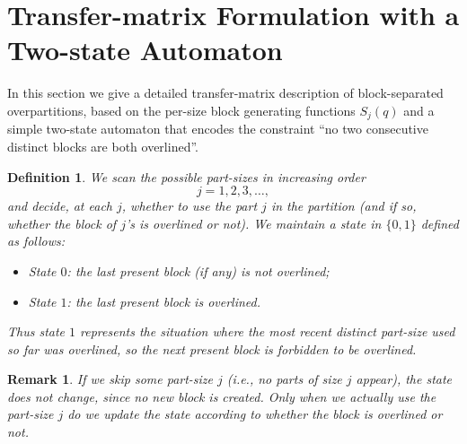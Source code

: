 \documentclass[letterpaper,12pt]{article}
\newtheorem{definition}{Definition}
\newtheorem{remark}{Remark}
\begin{document}
\section{Transfer-matrix Formulation with a Two-state Automaton}\label{sec:transfer_matrix}

In this section we give a detailed transfer-matrix description of
block-separated overpartitions, based on the per-size block generating functions
\(S_j(q)\) and a simple two-state automaton that encodes the
constraint ``no two consecutive distinct blocks are both overlined''.

\begin{definition}\label{def:states}
We scan the possible part-sizes in increasing order
\[
j = 1,2,3,\ldots,
\]
and decide, at each \(j\), whether to use the part \(j\) in the partition (and
if so, whether the block of \(j\)'s is overlined or not). We maintain a
\emph{state} in \(\{0,1\}\) defined as follows:
\begin{itemize}
  \item State \(0\): the last \emph{present} block (if any) is \emph{not overlined};
  \item State \(1\): the last present block \emph{is overlined}.
\end{itemize}
Thus state \(1\) represents the situation where the most recent distinct
part-size used so far was overlined, so the next present block is forbidden to be overlined.
\end{definition}

\begin{remark}
If we skip some part-size \(j\) (i.e., no parts of size \(j\) appear), the state
does not change, since no new block is created. Only when we actually use the
part-size \(j\) do we update the state according to whether the block is
overlined or not.
\end{remark}
\end{document}
